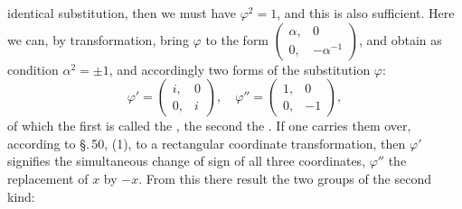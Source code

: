 
identical substitution, then we must have $\varphi^2 = 1$, and this is also sufficient. Here we can, by transformation, bring $\varphi$ to the form $\begin{pmatrix} \alpha, & 0 \\ 0, & -\alpha^{-1} \end{pmatrix}$, and obtain as condition $\alpha^2 = \pm 1$, and accordingly two forms of the substitution $\varphi$:
\[
\varphi' = \begin{pmatrix} i, & 0 \\ 0, & i \end{pmatrix}, \quad
\varphi'' = \begin{pmatrix} 1, & 0 \\ 0, & -1 \end{pmatrix},
\]
of which the first is called the , the second the . If one carries them over, according to \S.\,50, (1), to a rectangular coordinate transformation, then $\varphi'$ signifies the simultaneous change of sign of all three coordinates, $\varphi''$ the replacement of $x$ by $-x$. From this there result the two groups of the second kind:

